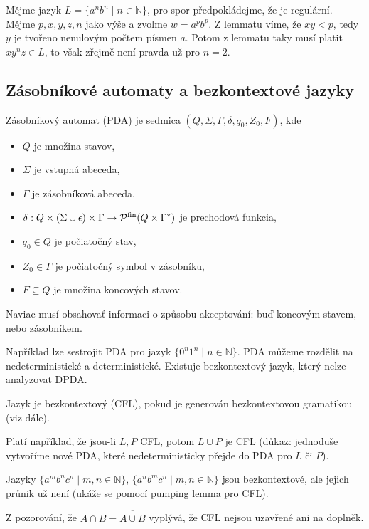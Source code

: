\begin{example}
    Mějme jazyk $L = \{ a^n b^n \mid n \in \mathbb{N} \}$,
    pro spor předpokládejme, že je regulární.
    Mějme $p,x,y,z,n$ jako výše a zvolme $w = a^p b^p$.
    Z lemmatu víme, že $xy < p$, tedy $y$ je tvořeno nenulovým počtem
    písmen $a$.  Potom z lemmatu taky musí platit $xy^nz \in L$, to však
    zřejmě není pravda už pro $n = 2$.
\end{example}

\subsection{Zásobníkové automaty a bezkontextové jazyky}

\begin{definition}
    Zásobníkový automat (PDA) je sedmica $(Q, \Sigma, \Gamma, \delta, q_0, Z_0,F)$, kde
	\begin{itemize}
		\item $Q$ je množina stavov,
		\item $\Sigma$ je vstupná abeceda,
		\item $\Gamma$ je zásobníková abeceda,
		\item $\delta : Q \times (\Sigma \cup \epsilon) \times \Gamma \to \mathcal{P}^{\text{fin}}(Q \times \Gamma^*)$ je prechodová funkcia,
		\item $q_0 \in Q$ je počiatočný stav,
		\item $Z_0 \in \Gamma$ je počiatočný symbol v zásobníku,
		\item $F \subseteq Q$ je množina koncových stavov.
	\end{itemize}
    Naviac musí obsahovať informaci o způsobu akceptování: buď koncovým stavem, nebo
    zásobníkem.
\end{definition}

Například lze sestrojit PDA pro jazyk
$\{ 0^n 1^n \mid n \in \mathbb{N} \}$.
PDA můžeme rozdělit na nedeterministické a deterministické. Existuje
bezkontextový jazyk, který nelze analyzovat DPDA.

\begin{definition}
    Jazyk je bezkontextový (CFL), pokud je generován bezkontextovou
    gramatikou (viz dále).
\end{definition}

Platí například, že jsou-li $L, P$ CFL, potom $L \cup P$ je CFL (důkaz:
jednoduše vytvoříme nové PDA, které nedeterministicky přejde do PDA pro
$L$ či $P$).

\begin{example}
    Jazyky
    $\{ a^m b^n c^n \mid m, n \in \mathbb{N} \}$,
    $\{ a^n b^m c^n \mid m, n \in \mathbb{N} \}$
    jsou bezkontextové, ale
    jejich průnik už není (ukáže se pomocí pumping lemma pro CFL).

    Z pozorování, že
    $A \cap B = \overline{\overline{A} \cup \overline{B}}$
    vyplývá, že CFL nejsou uzavřené ani na doplněk.
\end{example}

